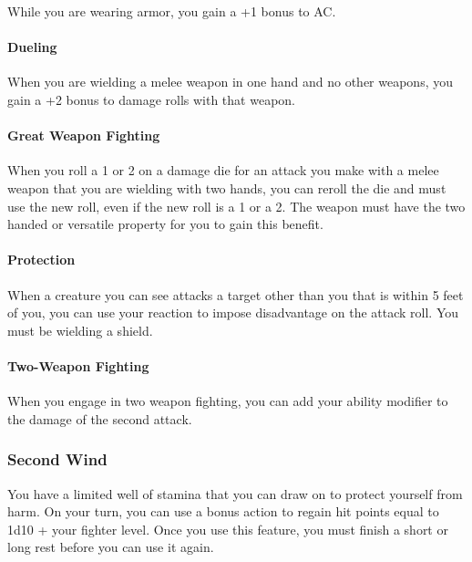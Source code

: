\documentclass[
]{article}
\begin{document}
While you are wearing armor, you gain a +1 bonus to AC.

\hypertarget{dueling}{%
\paragraph{Dueling}\label{dueling}}

When you are wielding a melee weapon in one hand and no other weapons,
you gain a +2 bonus to damage rolls with that weapon.

\hypertarget{great-weapon-fighting}{%
\paragraph{Great Weapon Fighting}\label{great-weapon-fighting}}

When you roll a 1 or 2 on a damage die for an attack you make with a
melee weapon that you are wielding with two hands, you can reroll the
die and must use the new roll, even if the new roll is a 1 or a 2. The
weapon must have the two handed or versatile property for you to gain
this benefit.

\hypertarget{protection}{%
\paragraph{Protection}\label{protection}}

When a creature you can see attacks a target other than you that is
within 5 feet of you, you can use your reaction to impose disadvantage
on the attack roll. You must be wielding a shield.

\hypertarget{two-weapon-fighting}{%
\paragraph{Two-Weapon Fighting}\label{two-weapon-fighting}}

When you engage in two weapon fighting, you can add your ability
modifier to the damage of the second attack.

\hypertarget{second-wind}{%
\subsubsection{Second Wind}\label{second-wind}}

You have a limited well of stamina that you can draw on to protect
yourself from harm. On your turn, you can use a bonus action to regain
hit points equal to 1d10 + your fighter level. Once you use this
feature, you must finish a short or long rest before you can use it
again.
\end{document}
